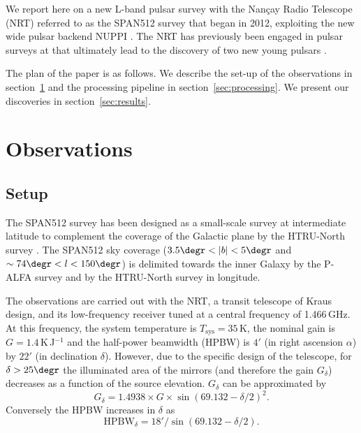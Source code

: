 \documentclass[a4paper,fleqn,usenatbib]{mnras}
\begin{document}
We report here on a new L-band pulsar survey with the Nan\c cay Radio
Telescope (NRT) referred to as the SPAN512 survey that began in 2012,
exploiting the new wide pulsar backend NUPPI \citep{dbc+11}. The NRT
has previously been engaged in pulsar surveys at \citep{frc+97} that
ultimately lead to the discovery of two new young pulsars
\citep{tpc+11}.

The plan of the paper is as follows. We describe the set-up of the
observations in section~\ref{sec:obs} and the processing pipeline in
section~\ref{sec:processing}. We present our discoveries in
section~\ref{sec:results}.

\section{Observations}
\label{sec:obs}

\subsection{Setup}

The SPAN512 survey has been designed as a small-scale survey at
intermediate latitude to complement the coverage of the Galactic plane
by the HTRU-North survey \citep{bck+13}. The SPAN512 sky coverage
($3.5\degr < |b| < 5\degr$ and $\sim 74\degr < l < 150\degr$) is
delimited towards the inner Galaxy by the P-ALFA survey
\citep{cfl+06,lbh+15} and by the HTRU-North survey \citep{bck+13} in
longitude.

The observations are carried out with the NRT, a transit telescope of
Kraus design, and its low-frequency receiver tuned at a central
frequency of 1.466\,GHz. At this frequency, the system temperature is
$T_{\text{sys}} = 35$\,K, the nominal gain is $G=1.4$\,K\,J$^{-1}$ and
the half-power beamwidth (HPBW) is $4'$ (in right ascension $\alpha$) by $22'$ (in
declination $\delta$). However, due to the specific design of the
telescope, for $\delta > 25\degr$ the illuminated area of the mirrors
(and therefore the gain $G_\delta$) decreases as a function of the
source elevation. $G_\delta$ can be approximated by
\begin{equation}
G_\delta = 1.4938 \times G \times \sin \left(69.132-\delta/2 \right)^2.
\end{equation}
Conversely the HPBW  increases in $\delta$ as 
\begin{equation}
\text{HPBW}_\delta = 18' / \sin \left(69.132 - \delta/2 \right).
\end{equation}
\end{document}
